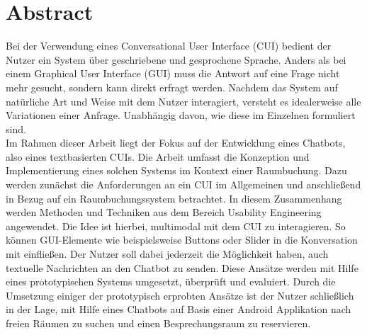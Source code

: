 
\section*{Abstract}
\label{sec:abstract}

Bei der Verwendung eines Conversational User Interface (CUI) bedient der Nutzer ein System über geschriebene und gesprochene Sprache. Anders als bei einem Graphical User Interface (GUI) muss die Antwort auf eine Frage nicht mehr gesucht, sondern kann direkt erfragt werden. Nachdem das System auf natürliche Art und Weise mit dem Nutzer interagiert, versteht es idealerweise alle Variationen einer Anfrage. Unabhängig davon, wie diese im Einzelnen formuliert sind. \\
Im Rahmen dieser Arbeit liegt der Fokus auf der Entwicklung eines Chatbots, also eines textbasierten CUIs. Die Arbeit umfasst die Konzeption und Implementierung eines solchen Systems im Kontext einer Raumbuchung. Dazu werden zunächst die Anforderungen an ein CUI im Allgemeinen und anschließend in Bezug auf ein Raumbuchungssystem betrachtet. In diesem Zusammenhang werden Methoden und Techniken aus dem Bereich Usability Engineering angewendet. Die Idee ist hierbei, multimodal mit dem CUI zu interagieren. So können GUI-Elemente wie beispielsweise Buttons oder Slider in die Konversation mit einfließen. Der Nutzer soll dabei jederzeit die Möglichkeit haben, auch textuelle Nachrichten an den Chatbot zu senden. Diese Ansätze werden mit Hilfe eines prototypischen Systems umgesetzt, überprüft und evaluiert. Durch die Umsetzung einiger der prototypisch erprobten Ansätze ist der Nutzer schließlich in der Lage, mit Hilfe eines Chatbots auf Basis einer Android Applikation nach freien Räumen zu suchen und einen Besprechungsraum zu reservieren.